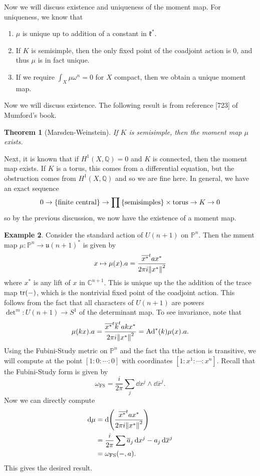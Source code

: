 \documentclass[leqno, openany]{memoir}
\newtheorem{thm}{Theorem}[section]
\theoremstyle{definition}
\newtheorem{exm}[thm]{Example}
\theoremstyle{remark}
\theoremstyle{plain}
\theoremstyle{definition}
\theoremstyle{remark}
\newcommand{\C}{\mathbb{C}}
\newcommand{\Q}{\mathbb{Q}}
\renewcommand{\P}{\mathbb{P}}
\newcommand{\mf}[1]{\mathfrak{#1}}
\newcommand{\mr}[1]{\mathrm{#1}}
\newcommand{\ol}[1]{\overline{#1}}
\begin{document}
Now we will discuss existence and uniqueness of the moment map. For uniqueness, we know that
\begin{enumerate}
    \item $\mu$ is unique up to addition of a constant in $\mf{k}^*$.
    \item If $K$ is semisimple, then the only fixed point of the coadjoint action is $0$, and thus $\mu$ is in fact unique.
    \item If we require $\int_X \mu \omega^n = 0$ for $X$ compact, then we obtain a unique moment map.
\end{enumerate}

Now we will discuss existence. The following result is from reference [723] of Mumford's book.

\begin{thm}[Marsden-Weinstein]
    If $K$ is semisimple, then the moment map $\mu$ exists.
\end{thm}

Next, it is known that if $H^1(X,\Q) = 0$ and $K$ is connected, then the moment map exists. If $K$ is a torus, this comes from a differential equation, but the obstruction comes from $H^1(X, \Q)$ and so we are fine here. In general, we have an exact sequence
\[ 0 \to \qty{\text{finite central}} \to \prod \qty{\text{semisimples}} \times \text{torus} \to K \to 0 \]
so by the previous discussion, we now have the existence of a moment map.

\begin{exm}
    Consider the standard action of $U(n+1)$ on $\P^n$. Then the mment map $\mu \colon \P^n \to \mf{u}(n+1)^*$ is given by
    \[ x \mapsto \mu(x) .a = \frac{\ol{x^*}^t a x^*}{2 \pi i \norm{x^*}^2} \]
    where $x^*$ is any lift of $x$ in $\C^{n+1}$. This is unique up the the addition of the trace map $\tr(-)$, which is the nontrivial fixed point of the coadjoint action. This follows from the fact that all characters of $U(n+1)$ are powers $\det^m \colon U(n+1) \to S^1$ of the determinant map. To see invariance, note that
    \[ \mu(kx).a = \frac{\ol{x^*}^t \ol{k}^t a k x^*}{2 \pi i \norm{x^*}^2} = \mr{Ad}^*(k) \mu(x).a. \]
    Using the Fubini-Study metric on $\P^n$ and the fact tha tthe action is transitive, we will compute at the point $[ 1:0:\cdots :0 ]$ with coordinates $[1:x^1:\cdots :x^n]$. Recall that the Fubini-Study form is given by
    \[ \omega_{\mr{FS}} = \frac{i}{2\pi} \sum_j \dd{x}^j \wedge \dd{\ol{x}}^j. \]
    Now we can directly compute
    \begin{align*}
        \dd{\mu} &= \dd{\qty(\frac{\ol{x^*}^t a x^*}{2 \pi i \norm{x^*}^2})} \\
                 &= \frac{i}{2\pi} \sum \ol{a}_j \dd{x^j} - a_j \dd{\ol{x}}^j \\
                 &= \omega_{\mr{FS}}(-,a).
    \end{align*}
    This gives the desired result.
\end{exm}
\end{document}
